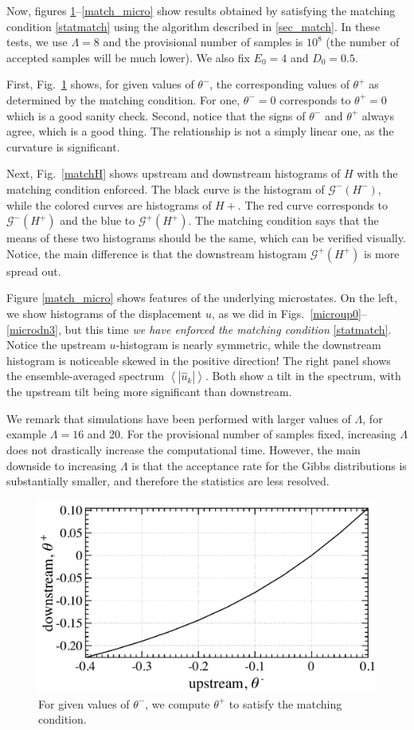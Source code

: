 \documentclass[12pt]{article}
\newcommand{\abs}[1]{\left| #1 \right|}
\newcommand{\mean}[1]{\left< #1 \right>}
\newcommand{\uhat}{\hat{u}}
\newcommand{\Gibbs}{\mathcal{G}}
\begin{document}
Now, figures \ref{match_theta}--\ref{match_micro} show results obtained by satisfying the matching condition \eqref{statmatch} using the algorithm described in \ref{sec_match}. In these tests, we use $\Lambda = 8$ and the provisional number of samples is $10^8$ (the number of accepted samples will be much lower). We also fix $E_0 = 4$ and $D_0 = 0.5$.

First, Fig.~\ref{match_theta} shows, for given values of $\theta^-$, the corresponding values of $\theta^+$ as determined by the matching condition. For one, $\theta^- = 0$ corresponds to $\theta^+ = 0$ which is a good sanity check. Second, notice that the signs of $\theta^-$ and $\theta^+$ always agree, which is a good thing. The relationship is not a simply linear one, as the curvature is significant.
 
 Next, Fig.~\ref{matchH} shows upstream and downstream histograms of $H$ with the matching condition enforced. The black curve is the histogram of $\Gibbs^-(H^-)$, while the colored curves are histograms of $H+$. The red curve corresponds to $\Gibbs^-(H^+)$ and the blue to $\Gibbs^+(H^+)$. The matching condition says that the means of these two histograms should be the same, which can be verified visually. Notice, the main difference is that the downstream histogram $\Gibbs^+(H^+)$ is more spread out.
 
Figure \ref{match_micro} shows features of the underlying microstates. On the left, we show histograms of the displacement $u$, as we did in Figs.~\ref{microup0}--\ref{microdn3}, but this time {\em we have enforced the matching condition} \eqref{statmatch}. Notice the upstream $u$-histogram is nearly symmetric, while the downstream histogram is noticeable skewed in the positive direction! The right panel shows the ensemble-averaged spectrum $\mean{\abs{\uhat_k}}$. Both show a tilt in the spectrum, with the upstream tilt being more significant than downstream.

We remark that simulations have been performed with larger values of $\Lambda$, for example $\Lambda = 16$ and 20. For the provisional number of samples fixed, increasing $\Lambda$ does not drastically increase the computational time. However, the main downside to increasing $\Lambda$ is that the acceptance rate for the Gibbs distributions is substantially smaller, and therefore the statistics are less resolved.


\begin{figure}%
\begin{center}
\includegraphics[width = 0.55 \textwidth]{match_theta}
\caption{For given values of $\theta^-$, we compute $\theta^+$ to satisfy the matching condition.}
\label{match_theta}
\end{center}
\end{figure}
 
\end{document}

